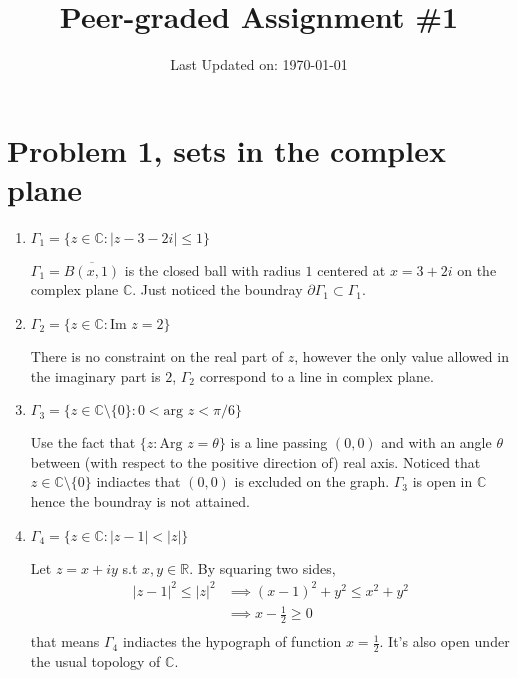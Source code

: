 \documentclass{article}
\title{Peer-graded Assignment \#1}
\date{Last Updated on: \today}
\numberwithin{equation}{section}
\newcommand{\abs}[1]{\left\vert #1 \right\vert}
\begin{document}
\maketitle
\tableofcontents
\section{Problem 1, sets in the complex plane}

\begin{enumerate}
	\item 	$\Gamma_1 = \{z\in\mathbb{C}: \abs{z-3-2i}\leq 1\}$
		\begin{solution}
			$\Gamma_1 = \overline{B(x,1)}$ is the closed ball with radius $1$ centered at $x = 3+2i$ on the complex plane $\mathbb{C}$. Just noticed the boundray $\partial \Gamma_1\subset\Gamma_1$.
		\end{solution}
	\item	 $\Gamma_2 = \{z\in\mathbb{C}: \textrm{Im } z = 2\}$
		\begin{solution}
			There is no constraint on the real part of $z$, however the only value allowed in the imaginary part is $2$, $\Gamma_2$ correspond to a line in complex plane.
		\end{solution}
	\item 	$\Gamma_3=\{z\in \mathbb{C}\setminus \{0\} : 0< \textrm{arg } z < \pi/6\}$
		\begin{solution}
			 Use the fact that $\{z:\textrm{Arg }z = \theta\}$ is a line passing $(0,0)$ and with an angle $\theta$ between (with respect to the positive direction of) real axis. Noticed that $z\in \mathbb{C}\setminus \{0\}$ indiactes that $(0,0)$ is excluded on the graph. $\Gamma_3$ is open in $\mathbb{C}$ hence the boundray is not attained.
		\end{solution}
	\item 	$\Gamma_4=\{z\in\mathbb{C}: \abs{z-1}<\abs{z}\}$
		\begin{solution}
			Let $z=x+iy$ s.t $x,y \in \mathbb{R}$. By squaring two sides, 
			\begin{equation}
				\begin{split}
					\abs{z-1}^2\leq\abs{z}^2 &\implies (x-1)^2+y^2 \leq x^2+y^2\\
					{}&\implies x-\frac{1}{2}\geq 0\\
				\end{split}
			\end{equation}
		that means $\Gamma_4$ indiactes the hypograph of function $x=\frac{1}{2}$. It's also open under the usual topology of $\mathbb{C}$.
		\end{solution}
\end{enumerate}
\end{document}
